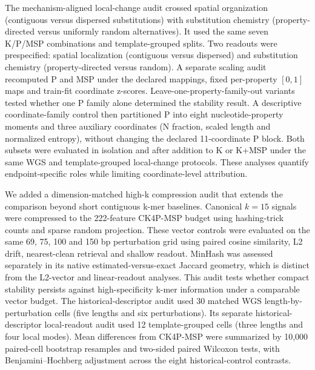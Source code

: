 The mechanism-aligned local-change audit crossed spatial organization (contiguous versus dispersed substitutions) with substitution chemistry (property-directed versus uniformly random alternatives). It used the same seven K/P/MSP combinations and template-grouped splits. Two readouts were prespecified: spatial localization (contiguous versus dispersed) and substitution chemistry (property-directed versus random). A separate scaling audit recomputed P and MSP under the declared mappings, fixed per-property $[0,1]$ maps and train-fit coordinate z-scores. Leave-one-property-family-out variants tested whether one P family alone determined the stability result. A descriptive coordinate-family control then partitioned P into eight nucleotide-property moments and three auxiliary coordinates (N fraction, scaled length and normalized entropy), without changing the declared 11-coordinate P block. Both subsets were evaluated in isolation and after addition to K or K+MSP under the same WGS and template-grouped local-change protocols. These analyses quantify endpoint-specific roles while limiting coordinate-level attribution.

We added a dimension-matched high-k compression audit that extends the comparison beyond short contiguous k-mer baselines. Canonical $k=15$ signals were compressed to the 222-feature CK4P-MSP budget using hashing-trick counts and sparse random projection. These vector controls were evaluated on the same 69, 75, 100 and 150 bp perturbation grid using paired cosine similarity, L2 drift, nearest-clean retrieval and shallow readout. MinHash was assessed separately in its native estimated-versus-exact Jaccard geometry, which is distinct from the L2-vector and linear-readout analyses. This audit tests whether compact stability persists against high-specificity k-mer information under a comparable vector budget. The historical-descriptor audit used 30 matched WGS length-by-perturbation cells (five lengths and six perturbations). Its separate historical-descriptor local-readout audit used 12 template-grouped cells (three lengths and four local modes). Mean differences from CK4P-MSP were summarized by 10,000 paired-cell bootstrap resamples and two-sided paired Wilcoxon tests, with Benjamini--Hochberg adjustment across the eight historical-control contrasts.

